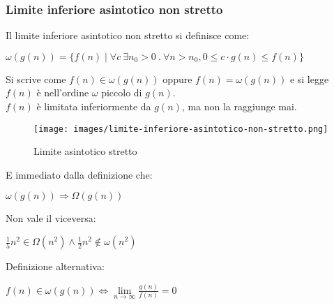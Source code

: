 \subsubsection{Limite inferiore asintotico non stretto}
\begin{definition}
Il limite inferiore asintotico non stretto si definisce come:
\begin{center}
    $\omega(g(n)) = \{f(n) \mid \forall c \: \exists n_0 > 0 \: . \: \forall n > n_0, 0 \leq c \cdot g(n) \leq f(n) \}$
\end{center}
\end{definition}
\hspace{-15pt}Si scrive come $f(n) \in \omega(g(n))$ oppure $f(n) = \omega(g(n))$ e si legge $f(n)$ è nell'ordine $\omega$ piccolo di $g(n)$.\\
$f(n)$ è limitata inferiormente da $g(n)$, ma non la raggiunge mai.\\
\begin{wrapfigure}[7]{l}{7cm}
    \vspace{-15pt}
    \centering
    \texttt{[image: images/limite-inferiore-asintotico-non-stretto.png]}
    \vspace{-5pt}
    \caption{Limite asintotico stretto}
\end{wrapfigure}

\vspace{-15pt}
E immediato dalla definizione che:
\begin{center}
    $\omega(g(n)) \Longrightarrow \Omega(g(n))$
\end{center}
Non vale il viceversa: 
\begin{center}
    $\frac{1}{5}n^2 \in \Omega(n^2) \land \frac{1}{2}n^2 \notin \omega(n^2)$
\end{center}
Definizione alternativa:
\begin{center}
    $f(n) \in \omega(g(n)) \Longleftrightarrow \lim\limits_{n\to \infty}\frac{g(n)}{f(n)} = 0$
\end{center}
